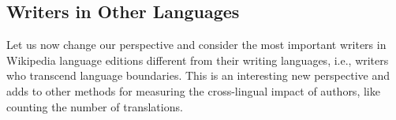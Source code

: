 \documentclass[a4paper,12pt]{scrartcl}
\begin{document}
\subsection{Writers in Other Languages}\label{sec:writ-other-lang}


Let us now change our perspective and consider the most important
writers in Wikipedia language editions different from their writing
languages, i.e., writers who transcend language boundaries. This is an
interesting new perspective and adds to other methods for measuring
the cross-lingual impact of authors, like counting the number of
translations.
\end{document}
